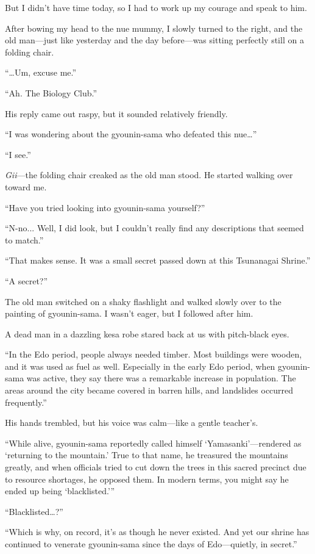 \documentclass[
    a4paper,
    12pt,
    twoside,
    openany,
    UTF8,
    fontset=windows
]{ctexbook}
\begin{document}
But I didn't have time today, so I had to work up my courage and speak to him.

After bowing my head to the nue mummy, I slowly turned to the right, and the old man---just like yesterday and the day before---was sitting perfectly still on a folding chair.

``\dots Um, excuse me.''

``Ah. The Biology Club.''

His reply came out raspy, but it sounded relatively friendly.

``I was wondering about the gyounin-sama who defeated this nue\dots''

``I see.''

\textit{Gii}---the folding chair creaked as the old man stood. He started walking over toward me.

``Have you tried looking into gyounin-sama yourself?''

``N-no... Well, I did look, but I couldn't really find any descriptions that seemed to match.''

``That makes sense. It was a small secret passed down at this Tsunanagai Shrine.''

``A secret?''

The old man switched on a shaky flashlight and walked slowly over to the painting of gyounin-sama. I wasn't eager, but I followed after him.

A dead man in a dazzling kesa robe stared back at us with pitch-black eyes.

``In the Edo period, people always needed timber. Most buildings were wooden, and it was used as fuel as well. Especially in the early Edo period, when gyounin-sama was active, they say there was a remarkable increase in population. The areas around the city became covered in barren hills, and landslides occurred frequently.''

His hands trembled, but his voice was calm---like a gentle teacher's.

``While alive, gyounin-sama reportedly called himself `Yamasanki'---rendered as `returning to the mountain.' True to that name, he treasured the mountains greatly, and when officials tried to cut down the trees in this sacred precinct due to resource shortages, he opposed them. In modern terms, you might say he ended up being `blacklisted.'''

``Blacklisted\dots?''

``Which is why, on record, it's as though he never existed. And yet our shrine has continued to venerate gyounin-sama since the days of Edo---quietly, in secret.''
\end{document}
